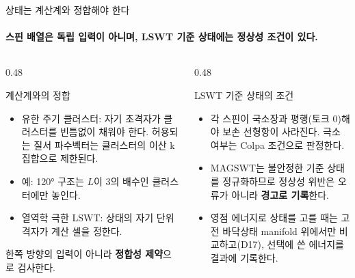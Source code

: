 \begin{frame}[label=state-geometry]{상태는 계산계와 정합해야 한다}
  \framesubtitle{스핀 배열은 독립 입력이 아니며, LSWT 기준 상태에는 정상성 조건이 있다.}
  \begin{columns}[T,onlytextwidth]
    \begin{column}{0.48\textwidth}
      \begin{block}{계산계와의 정합}
        \begin{itemize}
          \item 유한 주기 클러스터: 자기 초격자가 클러스터를 빈틈없이 채워야 한다.
            허용되는 질서 파수벡터는 클러스터의 이산 k 집합으로 제한된다.
          \item 예: 120° 구조는 $L$이 3의 배수인 클러스터에만 놓인다.
          \item 열역학 극한 LSWT: 상태의 자기 단위격자가 계산 셀을 정한다.
        \end{itemize}
      \end{block}
      \smallskip
      한쪽 방향의 입력이 아니라 \textbf{정합성 제약}으로 검사한다.
    \end{column}
    \begin{column}{0.48\textwidth}
      \begin{block}{LSWT 기준 상태의 조건}
        \begin{itemize}
          \item 각 스핀이 국소장과 평행(토크 0)해야 보손 선형항이 사라진다.
            극소 여부는 Colpa 조건으로 판정한다.
          \item MAGSWT는 불안정한 기준 상태를 정규화하므로 정상성 위반은
            오류가 아니라 \textbf{경고로 기록}한다.
          \item 영점 에너지로 상태를 고를 때는 고전 바닥상태 manifold 위에서만 비교하고(D17),
            선택에 쓴 에너지를 결과에 기록한다.
        \end{itemize}
      \end{block}
    \end{column}
  \end{columns}
  \par\medskip
\end{frame}
